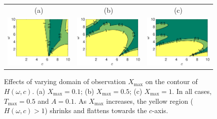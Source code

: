 \documentclass[a4paper,11pt]{article}
\begin{document}
%
\begin{figure}
\centering
\begin{tabular}{ccc}
(a)&(b)&(c)\\
\includegraphics[width=2in]{Figures/MIPcontour1.eps}&
\includegraphics[width=2in]{Figures/MIPcontour2.eps}&
\includegraphics[width=2in]{Figures/MIPcontour3.eps}
\end{tabular}
\caption{Effects of varying domain of observation $X_{\max}$ on the contour of $H(\omega,c)$. (a) $X_{\max}=0.1$; (b) $X_{\max}=0.5$; (c) $X_{\max}=1$.  In all cases, $T_{\max}=0.5$ and $A=0.1$. As $X_{\max}$ increases, the yellow region ($H(\omega,c)>1$) shrinks and flattens towards the $c$-axis.}\label{fig.MIPtest1}
\end{figure}
\end{document}
